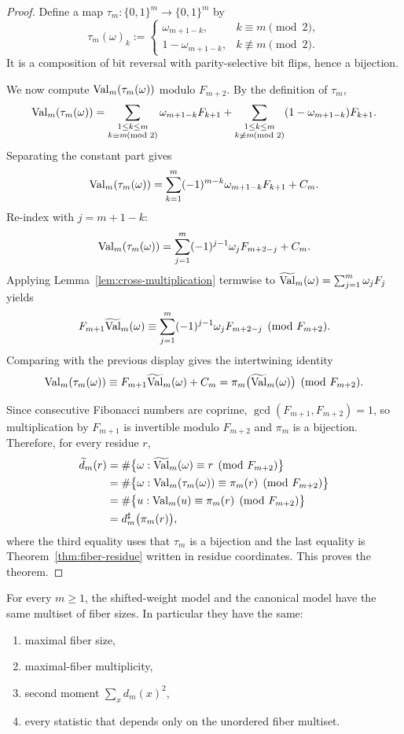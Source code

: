 \begin{proof}
Define a map $\tau_m:\{0,1\}^m\to\{0,1\}^m$ by
\[
\tau_m(\omega)_k :=
\begin{cases}
\omega_{m+1-k}, & k\equiv m\!\!\!\pmod 2,\\[1mm]
1-\omega_{m+1-k}, & k\not\equiv m\!\!\!\pmod 2.
\end{cases}
\]
It is a composition of bit reversal with parity-selective bit flips, hence a bijection.

We now compute $\mathrm{Val}_m(\tau_m(\omega))$ modulo $F_{m+2}$. By the definition of $\tau_m$,
\[
\mathrm{Val}_m(\tau_m(\omega))
=
\sum_{\substack{1\le k\le m\\k\equiv m\!\!\!\pmod 2}} \omega_{m+1-k}F_{k+1}
{}+\sum_{\substack{1\le k\le m\\k\not\equiv m\!\!\!\pmod 2}} (1-\omega_{m+1-k})F_{k+1}.
\]
Separating the constant part gives
\[
\mathrm{Val}_m(\tau_m(\omega))
=
\sum_{k=1}^m (-1)^{m-k}\omega_{m+1-k}F_{k+1}+C_m.
\]
Re-index with $j=m+1-k$:
\[
\mathrm{Val}_m(\tau_m(\omega))
=
\sum_{j=1}^m (-1)^{j-1}\omega_jF_{m+2-j}+C_m.
\]
Applying Lemma~\ref{lem:cross-multiplication} termwise to $\widetilde{\mathrm{Val}}_m(\omega)=\sum_{j=1}^m \omega_jF_j$ yields
\[
F_{m+1}\widetilde{\mathrm{Val}}_m(\omega)
\equiv
\sum_{j=1}^m (-1)^{j-1}\omega_jF_{m+2-j}
\pmod{F_{m+2}}.
\]
Comparing with the previous display gives the intertwining identity
\[
\mathrm{Val}_m(\tau_m(\omega))\equiv F_{m+1}\widetilde{\mathrm{Val}}_m(\omega)+C_m
=
\pi_m\bigl(\widetilde{\mathrm{Val}}_m(\omega)\bigr)
\pmod{F_{m+2}}.
\]

Since consecutive Fibonacci numbers are coprime, $\gcd(F_{m+1},F_{m+2})=1$, so multiplication by $F_{m+1}$ is invertible modulo $F_{m+2}$ and $\pi_m$ is a bijection. Therefore, for every residue $r$,
\begin{align*}
\widetilde d_m(r)
&=
\#\bigl\{\omega:\widetilde{\mathrm{Val}}_m(\omega)\equiv r \pmod{F_{m+2}}\bigr\}\\
&=
\#\bigl\{\omega:\mathrm{Val}_m(\tau_m(\omega))\equiv \pi_m(r) \pmod{F_{m+2}}\bigr\}\\
&=
\#\bigl\{u:\mathrm{Val}_m(u)\equiv \pi_m(r) \pmod{F_{m+2}}\bigr\}\\
&=
d_m^\sharp\bigl(\pi_m(r)\bigr),
\end{align*}
where the third equality uses that $\tau_m$ is a bijection and the last equality is Theorem~\ref{thm:fiber-residue} written in residue coordinates. This proves the theorem.
\end{proof}

\begin{corollary}\label{cor:affine-transfer-stats}
For every $m\ge 1$, the shifted-weight model and the canonical model have the same multiset of fiber sizes. In particular they have the same:
\begin{enumerate}[label=(\roman*),leftmargin=*,itemsep=2pt]
  \item maximal fiber size,
  \item maximal-fiber multiplicity,
  \item second moment $\sum_x d_m(x)^2$,
  \item every statistic that depends only on the unordered fiber multiset.
\end{enumerate}
\end{corollary}

